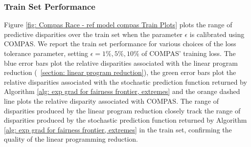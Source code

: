 \documentclass{article}
\begin{document}
\subsubsection{Train Set Performance}\label{section: race train set performance}
Figure \ref{fig: Compas Race - ref model compas Train Plots} plots the range of predictive disparities over the train set when the parameter $\epsilon$ is calibrated using COMPAS. We report the train set performance for various choices of the loss tolerance parameter, setting $\epsilon = 1\%, 5\%, 10\%$ of COMPAS' training loss.  The blue error bars plot the relative disparities associated with the linear program reduction (\textsection~\ref{section: linear program reduction}), the green error bars plot the relative disparities associated with the stochastic prediction function returned by Algorithm \ref{alg: exp grad for fairness frontier, extremes} and the orange dashed line plots the relative disparity associated with COMPAS. The range of disparities produced by the linear program reduction closely track the range of disparities produced by the stochastic prediction function returned by Algorithm \ref{alg: exp grad for fairness frontier, extremes} in the train set, confirming the quality of the linear programming reduction.
\end{document}
